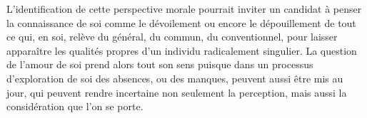 {L'identification de cette perspective morale pourrait inviter un candidat à penser la
connaissance de soi comme le dévoilement ou encore le dépouillement de tout ce qui,
en soi, relève du général, du commun, du conventionnel, pour laisser apparaître les
qualités propres d'un individu radicalement singulier. La question de l'amour de soi
prend alors tout son sens puisque dans un processus d'exploration de soi des
absences, ou des manques, peuvent aussi être mis au jour, qui peuvent rendre
incertaine non seulement la perception, mais aussi la considération que l'on se porte.}

\vfill{~}\clearpage

